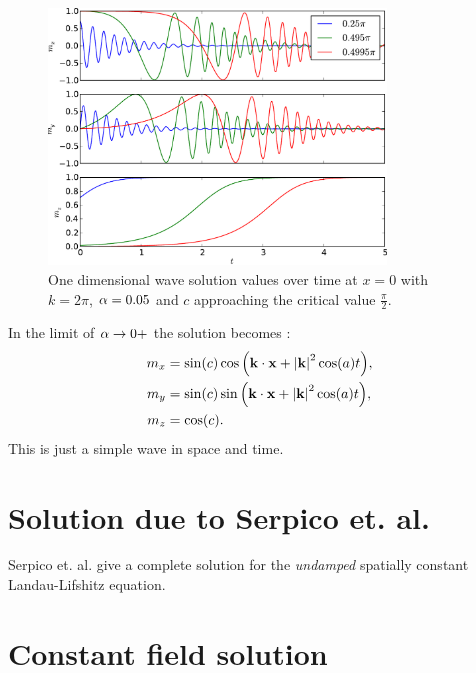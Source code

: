\begin{figure}
  \centering
  \includegraphics[width=0.8\textwidth]{plots/wave_exact_solution_parameters/exact_solution_parameters_complex.pdf}
  \caption{One dimensional wave solution values over time at $x=0$ with $k = 2\pi$, $\alpha = 0.05$ and $c$ approaching the critical value $\frac{\pi}{2}$.}
  \label{fig:wave-solution-vary-c-complex}
\end{figure}


In the limit of $\alpha \rightarrow 0+$ the solution becomes \cite{Fuwa2006}:
\begin{equation}
  \begin{aligned}
    m_x &= \sin(c) \cos{\left( \mathbf{k}\cdot \mathbf{x}+ \left|{\mathbf{k}} \right|^2 \cos(a) t \right)}, \\
    m_y &= \sin(c) \sin{\left( \mathbf{k}\cdot \mathbf{x}+ \left|{\mathbf{k}} \right|^2 \cos(a) t \right)}, \\
    m_z &= \cos(c).
  \end{aligned}
\end{equation}
This is just a simple wave in space and time.



\section{Solution due to Serpico et. al.}

Serpico et. al. \cite{Serpico2003} give a complete solution for the \emph{undamped} spatially constant Landau-Lifshitz equation.




\section{Constant field solution}

